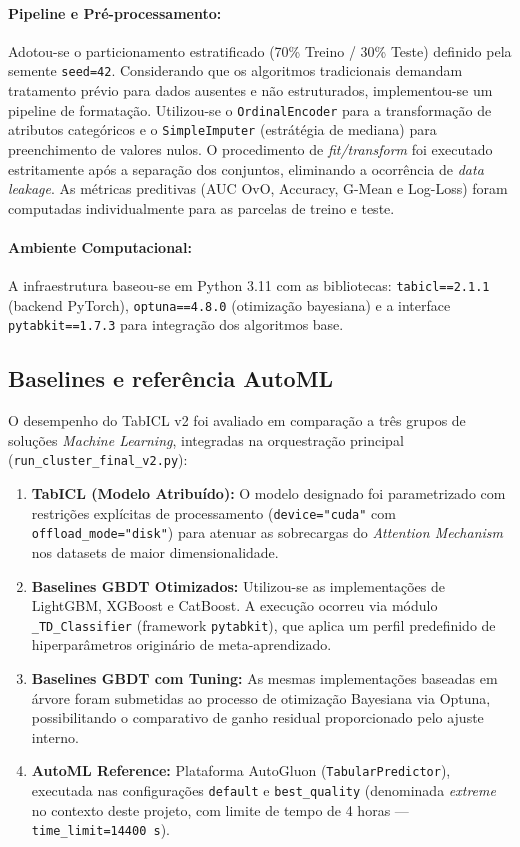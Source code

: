 \documentclass[12pt,a4paper]{article}
\begin{document}
\paragraph{Pipeline e Pré-processamento:} Adotou-se o particionamento estratificado (70\% Treino / 30\% Teste) definido pela semente \texttt{seed=42}. Considerando que os algoritmos tradicionais demandam tratamento prévio para dados ausentes e não estruturados, implementou-se um pipeline de formatação. Utilizou-se o \texttt{OrdinalEncoder} para a transformação de atributos categóricos e o \texttt{SimpleImputer} (estrátégia de mediana) para preenchimento de valores nulos. O procedimento de \textit{fit/transform} foi executado estritamente após a separação dos conjuntos, eliminando a ocorrência de \textit{data leakage}. As métricas preditivas (AUC OvO, Accuracy, G-Mean e Log-Loss) foram computadas individualmente para as parcelas de treino e teste.

\paragraph{Ambiente Computacional:} A infraestrutura baseou-se em Python 3.11 com as bibliotecas: \texttt{tabicl==2.1.1} (backend PyTorch), \texttt{optuna==4.8.0} (otimização bayesiana) e a interface \texttt{pytabkit==1.7.3} para integração dos algoritmos base.

\subsection{Baselines e referência AutoML}
O desempenho do TabICL v2 foi avaliado em comparação a três grupos de soluções \textit{Machine Learning}, integradas na orquestração principal (\texttt{run\_cluster\_final\_v2.py}):
\begin{enumerate}
    \item \textbf{TabICL (Modelo Atribuído):} O modelo designado foi parametrizado com restrições explícitas de processamento (\texttt{device="cuda"} com \texttt{offload\_mode="disk"}) para atenuar as sobrecargas do \textit{Attention Mechanism} nos datasets de maior dimensionalidade.
    \item \textbf{Baselines GBDT Otimizados:} Utilizou-se as implementações de LightGBM, XGBoost e CatBoost. A execução ocorreu via módulo \texttt{\_TD\_Classifier} (framework \texttt{pytabkit}), que aplica um perfil predefinido de hiperparâmetros originário de meta-aprendizado.
    \item \textbf{Baselines GBDT com Tuning:} As mesmas implementações baseadas em árvore foram submetidas ao processo de otimização Bayesiana via Optuna, possibilitando o comparativo de ganho residual proporcionado pelo ajuste interno.
    \item \textbf{AutoML Reference:} Plataforma AutoGluon (\texttt{TabularPredictor}), executada nas configurações \texttt{default} e \texttt{best\_quality} (denominada \textit{extreme} no contexto deste projeto, com limite de tempo de 4 horas — \texttt{time\_limit=14400~s}).
\end{enumerate}
\end{document}
